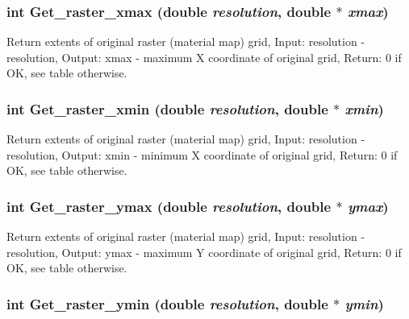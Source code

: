 \hypertarget{GisApi_8C_a45}{
\subsubsection[Get\_\-raster\_\-xmax]{\setlength{\rightskip}{0pt plus 5cm}int Get\_\-raster\_\-xmax (double {\em resolution}, double $\ast$ {\em xmax})}}
\label{GisApi_8C_a45}


Return extents of original raster (material map) grid, Input: resolution - resolution, Output: xmax - maximum X coordinate of original grid, Return: 0 if OK, see table otherwise. 

\hypertarget{GisApi_8C_a46}{
\subsubsection[Get\_\-raster\_\-xmin]{\setlength{\rightskip}{0pt plus 5cm}int Get\_\-raster\_\-xmin (double {\em resolution}, double $\ast$ {\em xmin})}}
\label{GisApi_8C_a46}


Return extents of original raster (material map) grid, Input: resolution - resolution, Output: xmin - minimum X coordinate of original grid, Return: 0 if OK, see table otherwise. 

\hypertarget{GisApi_8C_a47}{
\subsubsection[Get\_\-raster\_\-ymax]{\setlength{\rightskip}{0pt plus 5cm}int Get\_\-raster\_\-ymax (double {\em resolution}, double $\ast$ {\em ymax})}}
\label{GisApi_8C_a47}


Return extents of original raster (material map) grid, Input: resolution - resolution, Output: ymax - maximum Y coordinate of original grid, Return: 0 if OK, see table otherwise. 

\hypertarget{GisApi_8C_a48}{
\subsubsection[Get\_\-raster\_\-ymin]{\setlength{\rightskip}{0pt plus 5cm}int Get\_\-raster\_\-ymin (double {\em resolution}, double $\ast$ {\em ymin})}}
\label{GisApi_8C_a48}


